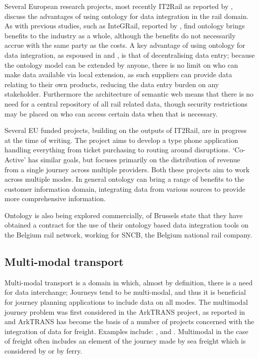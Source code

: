 Several European research projects, most recently IT2Rail as reported by \citet{Gogos2016}, discuss the advantages of using ontology for data integration in the rail domain. As with previous studies, such as InteGRail, reported  by \citet{Kopf2010}, \citet{Gogos2016} find ontology brings benefits to the industry as a whole, although the benefits do not necessarily accrue with the same party as the costs. A key advantage of using ontology for data integration, as espoused in \citep{Gogos2016} and \citep{Morris}, is that of decentralising data entry; because the ontology model can be extended by anyone, there is no limit on who can make data available via local extension, as such suppliers can provide data relating to their own products, reducing the data entry burden on any stakeholder. Furthermore the architecture of semantic web means that there is no need for a central repository of all rail related data, though security restrictions may be placed on who can access certain data when that is necessary.

Several EU funded projects, building on the outputs of IT2Rail, are in progress at the time of writing. The  project aims to develop a  type phone application handling everything from ticket purchasing to routing around disruptions. `Co-Active' has similar goals, but focuses primarily on the distribution of revenue from a single journey across multiple providers. Both these projects aim to work across multiple modes. In general ontology can bring a range of benefits to the customer information domain, integrating data from various sources to provide more comprehensive information. 

Ontology is also being explored commercially, \citet{ERTMSSolutions2017} of Brussels state that they have obtained a contract for the use of their ontology based data integration tools on the Belgium rail network, working for SNCB, the Belgium national rail company.

\subsection{Multi-modal transport}\label{subsec:multi}

Multi-modal transport is a domain in which, almost by definition, there is a need for data interchange; Journeys tend to be multi-modal, and thus it is beneficial for journey planning applications to include data on all modes. The multimodal journey problem was first considered in the ArkTRANS project, as reported in \citep{Natvig2003} and ArkTRANS has become the basis of a number of projects concerned with the integration of data for freight. Examples include: \citet{Gonczy2012} , \citep{Rodseth2011} and \citep{Paganelli2009}. Multimodal in the case of freight often includes an element of the journey made by sea freight which is considered by \citet{Rodseth2011} or by ferry.

